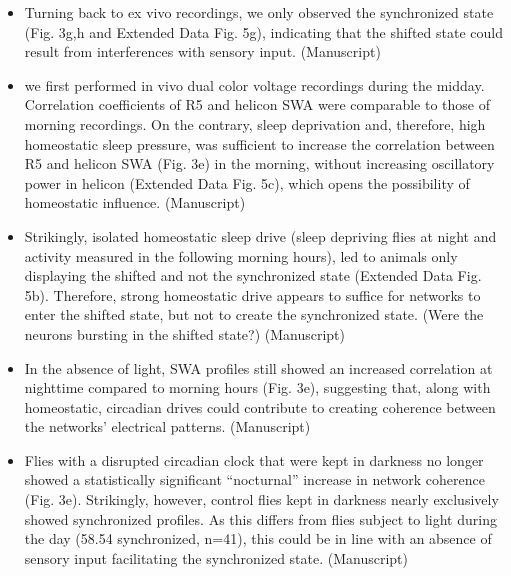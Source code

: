 \documentclass[11pt]{article}
\begin{document}
\begin{itemize}
    \item Turning back to ex vivo recordings, we only observed the synchronized state (Fig. 3g,h and
    Extended Data Fig. 5g), indicating that the shifted state could result from interferences with
    sensory input.
    \cite{raccugliaCoherentMultilevelNetwork2022} (Manuscript)

    \item we first performed in vivo dual color
    voltage recordings during the midday. Correlation coefficients of R5 and helicon SWA were
    comparable to those of morning recordings. On the contrary, sleep deprivation and,
    therefore, high homeostatic sleep pressure, was sufficient to increase the correlation between
    R5 and helicon SWA (Fig. 3e) in the morning, without increasing oscillatory power in helicon
    (Extended Data Fig. 5c), which opens the possibility of homeostatic influence.
    \cite{raccugliaCoherentMultilevelNetwork2022} (Manuscript)

    \item Strikingly,
    isolated homeostatic sleep drive (sleep depriving flies at night and activity measured in the
    following morning hours), led to animals only displaying the shifted and not the synchronized
    state (Extended Data Fig. 5b). Therefore, strong homeostatic drive appears to suffice for
    networks to enter the shifted state, but not to create the synchronized state.
    (Were the neurons bursting in the shifted state?)
    \cite{raccugliaCoherentMultilevelNetwork2022} (Manuscript)

    \item In
    the absence of light, SWA profiles still showed an increased correlation at nighttime compared
    to morning hours (Fig. 3e), suggesting that, along with homeostatic, circadian drives could
    contribute to creating coherence between the networks’ electrical patterns.
    \cite{raccugliaCoherentMultilevelNetwork2022} (Manuscript)

    \item Flies with a disrupted circadian clock that were kept in
    darkness no longer showed a statistically significant “nocturnal” increase in network
    coherence (Fig. 3e). Strikingly, however, control flies kept in darkness nearly exclusively showed synchronized
    profiles. As this differs from flies subject to light during the day (58.54%
    synchronized, n=41), this could be in line with an absence of sensory input facilitating the
    synchronized state.
    \cite{raccugliaCoherentMultilevelNetwork2022} (Manuscript)


\end{itemize}
\end{document}
